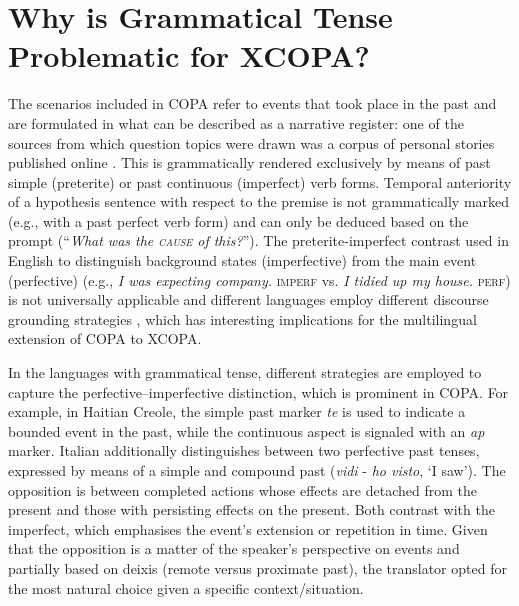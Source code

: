 \documentclass[11pt,a4paper]{article}
\begin{document}
\section{Why is Grammatical Tense Problematic for XCOPA?}
\label{ss:gramtense}
The scenarios included in COPA refer to events that took place in the past and are formulated in what can be described as a narrative register: one of the sources from which question topics were drawn was a corpus of personal stories published online \cite{gordon2009identifying}. This is grammatically rendered exclusively by means of past simple (preterite) or past continuous (imperfect) verb forms. Temporal anteriority of a hypothesis sentence with respect to the premise is not grammatically marked (e.g., with a past perfect verb form) and can only be deduced based on the prompt (``\textit{What was the \textsc{cause} of this?}''). The preterite-imperfect contrast used in English to distinguish background states (imperfective) from the main event (perfective) (e.g., \textit{I was expecting company.} \textsc{imperf} vs. \textit{I tidied up my house.} \textsc{perf}) is not universally applicable and different languages employ different discourse grounding strategies \cite{hopper1979aspect}, which has interesting implications for the multilingual extension of COPA to XCOPA.

In the languages with grammatical tense, different strategies are employed to capture the perfective--imperfective distinction, which is prominent in COPA. For example, in Haitian Creole, the simple past marker \textit{te} is used to indicate a bounded event in the past, while the continuous aspect is signaled with an \textit{ap} marker. Italian additionally distinguishes between two perfective past tenses, expressed by means of a simple and compound past (\textit{vidi} - \textit{ho visto}, `I saw'). The opposition is between completed actions whose effects are detached from the present and those with persisting effects on the present. Both contrast with the imperfect, which emphasises the event's extension or repetition in time. Given that the opposition is a matter of the speaker's perspective on events and partially based on deixis (remote versus proximate past), the translator opted for the most natural choice given a specific context/situation.
\end{document}
